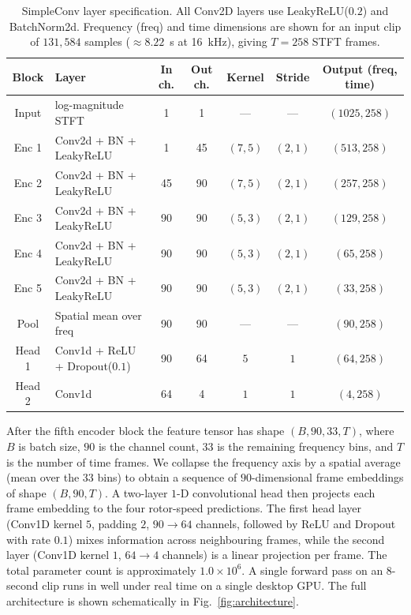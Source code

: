 \documentclass{QD_2026}
\begin{document}
\begin{table}[ht]
  \centering
  \caption{SimpleConv layer specification.
    All Conv2D layers use LeakyReLU($0.2$) and BatchNorm2d.
    Frequency (freq) and time dimensions are shown for an input clip of
    $131{,}584$ samples ($\approx 8.22$~s at \SI{16}{\kilo\hertz}),
    giving $T = 258$ STFT frames.
  }
  \label{tab:arch}
  \small
  \begin{tabular}{clccccc}
    \toprule
    Block & Layer & In ch. & Out ch. & Kernel & Stride & Output (freq, time) \\
    \midrule
    Input & log-magnitude STFT & 1 & 1 & --- & --- & $(1025, 258)$ \\
    Enc 1 & Conv2d + BN + LeakyReLU & 1 & 45 & $(7, 5)$ & $(2, 1)$ & $(513, 258)$ \\
    Enc 2 & Conv2d + BN + LeakyReLU & 45 & 90 & $(7, 5)$ & $(2, 1)$ & $(257, 258)$ \\
    Enc 3 & Conv2d + BN + LeakyReLU & 90 & 90 & $(5, 3)$ & $(2, 1)$ & $(129, 258)$ \\
    Enc 4 & Conv2d + BN + LeakyReLU & 90 & 90 & $(5, 3)$ & $(2, 1)$ & $(65, 258)$ \\
    Enc 5 & Conv2d + BN + LeakyReLU & 90 & 90 & $(5, 3)$ & $(2, 1)$ & $(33, 258)$ \\
    Pool & Spatial mean over freq & 90 & 90 & --- & --- & $(90, 258)$ \\
    Head 1 & Conv1d + ReLU + Dropout($0.1$) & 90 & 64 & $5$ & $1$ & $(64, 258)$ \\
    Head 2 & Conv1d & 64 & 4 & $1$ & $1$ & $(4, 258)$ \\
    \bottomrule
  \end{tabular}
\end{table}

After the fifth encoder block the feature tensor has shape
$(B, 90, 33, T)$, where $B$ is batch size, $90$ is the channel count, $33$ is
the remaining frequency bins, and $T$ is the number of time frames.
We collapse the frequency axis by a spatial average (mean over the $33$ bins)
to obtain a sequence of $90$-dimensional frame embeddings of shape $(B, 90, T)$.
A two-layer $1$-D convolutional head then projects each frame embedding to the
four rotor-speed predictions.
The first head layer (Conv1D kernel $5$, padding $2$, $90 \to 64$ channels,
followed by ReLU and Dropout with rate $0.1$) mixes information across
neighbouring frames, while the second layer (Conv1D kernel $1$, $64 \to 4$
channels) is a linear projection per frame.
The total parameter count is approximately $1.0 \times 10^{6}$.
A single forward pass on an $8$-second clip runs in well under real time on a
single desktop GPU.
The full architecture is shown schematically in Fig.~\ref{fig:architecture}.
\end{document}
